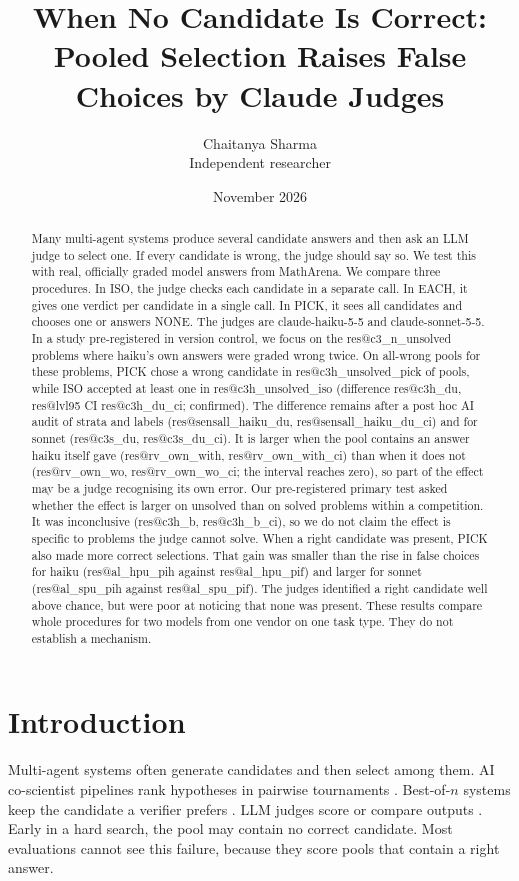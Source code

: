 \documentclass[10pt,twocolumn]{article}
\title{When No Candidate Is Correct: Pooled Selection Raises False Choices by Claude Judges}
\author{Chaitanya Sharma\\Independent researcher}
\date{November 2026}
\makeatletter
\newcommand{\res}[1]{\csname res@#1\endcsname}
\makeatother
\begin{document}
\maketitle

\begin{abstract}
Many multi-agent systems produce several candidate answers and then ask an LLM judge to select one. If every candidate is wrong, the judge should say so. We test this with real, officially graded model answers from MathArena. We compare three procedures. In ISO, the judge checks each candidate in a separate call. In EACH, it gives one verdict per candidate in a single call. In PICK, it sees all candidates and chooses one or answers NONE. The judges are claude-haiku-5-5 and claude-sonnet-5-5. In a study pre-registered in version control, we focus on the \res{c3_n_unsolved} problems where haiku's own answers were graded wrong twice. On all-wrong pools for these problems, PICK chose a wrong candidate in \res{c3h_unsolved_pick} of pools, while ISO accepted at least one in \res{c3h_unsolved_iso} (difference \res{c3h_du}, \res{lvl95} CI \res{c3h_du_ci}; confirmed). The difference remains after a post hoc AI audit of strata and labels (\res{sensall_haiku_du}, \res{sensall_haiku_du_ci}) and for sonnet (\res{c3s_du}, \res{c3s_du_ci}). It is larger when the pool contains an answer haiku itself gave (\res{rv_own_with}, \res{rv_own_with_ci}) than when it does not (\res{rv_own_wo}, \res{rv_own_wo_ci}; the interval reaches zero), so part of the effect may be a judge recognising its own error. Our pre-registered primary test asked whether the effect is larger on unsolved than on solved problems within a competition. It was inconclusive (\res{c3h_b}, \res{c3h_b_ci}), so we do not claim the effect is specific to problems the judge cannot solve. When a right candidate was present, PICK also made more correct selections. That gain was smaller than the rise in false choices for haiku (\res{al_hpu_pih} against \res{al_hpu_pif}) and larger for sonnet (\res{al_spu_pih} against \res{al_spu_pif}). The judges identified a right candidate well above chance, but were poor at noticing that none was present. These results compare whole procedures for two models from one vendor on one task type. They do not establish a mechanism.
\end{abstract}

\section{Introduction}
Multi-agent systems often generate candidates and then select among them. AI co-scientist pipelines rank hypotheses in pairwise tournaments \citep{gottweis2025towards}. Best-of-$n$ systems keep the candidate a verifier prefers \citep{cobbe2021training,brown2024large,stroebl2026limits}. LLM judges score or compare outputs \citep{zheng2023judging}. Early in a hard search, the pool may contain no correct candidate. Most evaluations cannot see this failure, because they score pools that contain a right answer.
\end{document}
